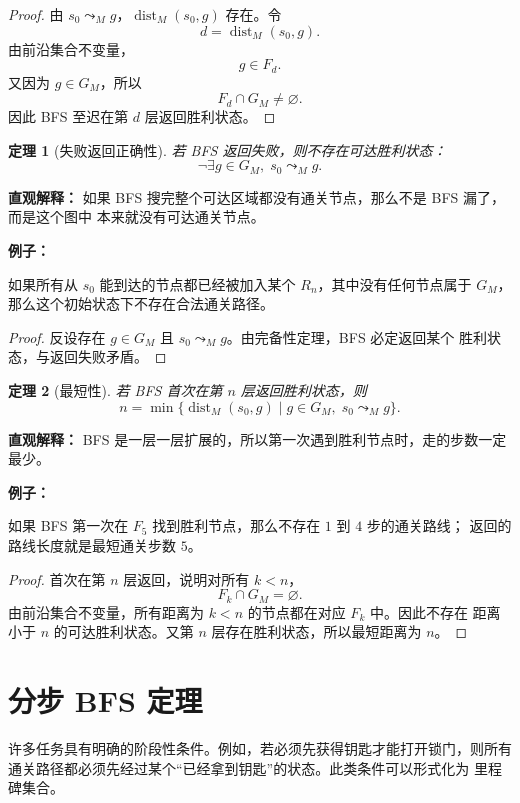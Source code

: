 \documentclass[UTF8]{ctexart}
\theoremstyle{nesylinkblock}
\newtheorem{theorem}{定理}
\DeclareMathOperator{\dist}{dist}
\newenvironment{examplebox}
  {\begin{center}\begin{lrbox}{\exampleboxcontent}\begin{minipage}{0.92\linewidth}
   \textbf{例子：}\par\smallskip}
  {\end{minipage}\end{lrbox}\fbox{\usebox{\exampleboxcontent}}\end{center}}
\begin{document}
\begin{proof}
由 $s_0\leadsto_M g$，$\dist_M(s_0,g)$ 存在。令
\[
  d=\dist_M(s_0,g).
\]
由前沿集合不变量，
\[
  g\in F_d.
\]
又因为 $g\in G_M$，所以
\[
  F_d\cap G_M\ne\varnothing.
\]
因此 BFS 至迟在第 $d$ 层返回胜利状态。
\end{proof}

\begin{theorem}[失败返回正确性]
若 BFS 返回失败，则不存在可达胜利状态：
\[
  \neg\exists g\in G_M,\; s_0\leadsto_M g.
\]
\end{theorem}

\noindent\textbf{直观解释：}
如果 BFS 搜完整个可达区域都没有通关节点，那么不是 BFS 漏了，而是这个图中
本来就没有可达通关节点。

\begin{examplebox}
如果所有从 $s_0$ 能到达的节点都已经被加入某个 $R_n$，其中没有任何节点属于
$G_M$，那么这个初始状态下不存在合法通关路径。
\end{examplebox}

\begin{proof}
反设存在 $g\in G_M$ 且 $s_0\leadsto_M g$。由完备性定理，BFS 必定返回某个
胜利状态，与返回失败矛盾。
\end{proof}

\begin{theorem}[最短性]
若 BFS 首次在第 $n$ 层返回胜利状态，则
\[
  n=
  \min\{\dist_M(s_0,g)\mid g\in G_M,\;s_0\leadsto_M g\}.
\]
\end{theorem}

\noindent\textbf{直观解释：}
BFS 是一层一层扩展的，所以第一次遇到胜利节点时，走的步数一定最少。

\begin{examplebox}
如果 BFS 第一次在 $F_5$ 找到胜利节点，那么不存在 $1$ 到 $4$ 步的通关路线；
返回的路线长度就是最短通关步数 $5$。
\end{examplebox}

\begin{proof}
首次在第 $n$ 层返回，说明对所有 $k<n$，
\[
  F_k\cap G_M=\varnothing.
\]
由前沿集合不变量，所有距离为 $k<n$ 的节点都在对应 $F_k$ 中。因此不存在
距离小于 $n$ 的可达胜利状态。又第 $n$ 层存在胜利状态，所以最短距离为 $n$。
\end{proof}

\section{分步 BFS 定理}

许多任务具有明确的阶段性条件。例如，若必须先获得钥匙才能打开锁门，则所有
通关路径都必须先经过某个“已经拿到钥匙”的状态。此类条件可以形式化为
里程碑集合。
\end{document}
